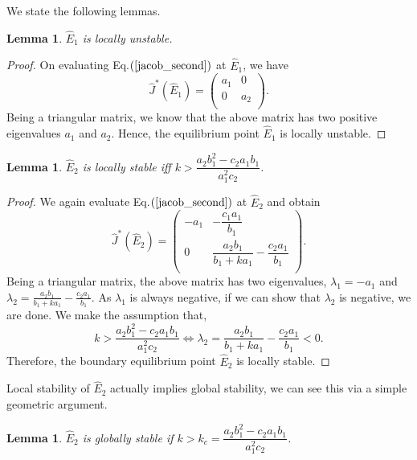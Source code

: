 \documentclass[10pt]{amsart}
\newtheorem{lemma}[theorem]{Lemma}
\theoremstyle{definition}
\begin{document}
We state the following lemmas.
\begin{lemma}
	$\widehat{E}_1$ is locally unstable.
\end{lemma}
\begin{proof}
	On evaluating Eq.$(\ref{jacob_second})$ at $\widehat{E}_1$, we have
	\begin{equation*}
		\widehat{J}^*(\widehat{E}_1)=
		\left(
		\begin{array}{cc}
			a_1 & 0 \\
			0 & a_2 \\
		\end{array}
		\right).
	\end{equation*}
	Being a triangular matrix, we know that the above matrix has two positive eigenvalues $a_1$ and $a_2$. Hence, the equilibrium point $\widehat{E}_1$ is locally unstable.
\end{proof}

\begin{lemma}\label{lem:ce_ode_1}
	$\widehat{E}_2$ is locally stable iff $k>\dfrac{a_2 b_1^2-c_2a_1b_1}{a_1^2c_2}$.
\end{lemma}
\begin{proof}
	We again evaluate Eq.$(\ref{jacob_second})$ at $\widehat{E}_2$ and obtain
	\begin{equation*}
		\widehat{J}^*(\widehat{E}_2)=
		\left(
		\begin{array}{cc}
			-a_1 & -\dfrac{c_1a_1}{b_1} \\
			0 &  \dfrac{a_2b_1}{b_1 + k a_1} -\dfrac{c_2 a_1}{b_1} \\
		\end{array}
		\right).
	\end{equation*}
	Being a triangular matrix, the above matrix has two eigenvalues, $\lambda_1=-a_1$ and $\lambda_2=\frac{a_2b_1}{b_1 + k a_1} -\frac{c_2 a_1}{b_1}$. As $\lambda_1$ is always negative, if we can show that $\lambda_2$ is negative, we are done. We make the assumption that,
	\[ k>\dfrac{a_2 b_1^2-c_2a_1b_1}{a_1^2c_2}  \iff \lambda_2 =\dfrac{a_2b_1}{b_1 + k a_1} - \dfrac{c_2 a_1}{b_1}<0. \]
	Therefore, the boundary equilibrium point $\widehat{E}_2$ is locally stable.
\end{proof}
Local stability of $\widehat{E}_2$ actually implies global stability, we can see this via a simple geometric argument.

\begin{lemma}\label{lem:ce_ode_2}
$\widehat{E}_2$ is globally stable if $k > k_{c} = \dfrac{a_2 b_1^2-c_2a_1b_1}{a_1^2c_2}$.
\end{lemma}
\end{document}
